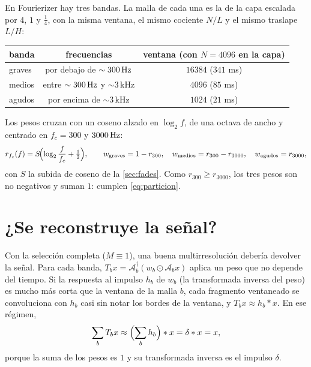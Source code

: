 En Fourierizer hay tres bandas. La malla de cada una es la de la capa escalada por $4$, $1$ y
$\tfrac14$, con la misma ventana, el mismo cociente $N/L$ y el mismo traslape $L/H$:
\begin{center}\small
\begin{tabular}{lcc}
\toprule
banda & frecuencias & ventana (con $N=4096$ en la capa) \\
\midrule
graves & por debajo de $\sim300\,\mathrm{Hz}$ & $16384$ ($341$ ms) \\
medios & entre $\sim300\,\mathrm{Hz}$ y $\sim3\,\mathrm{kHz}$ & $4096$ ($85$ ms) \\
agudos & por encima de $\sim3\,\mathrm{kHz}$ & $1024$ ($21$ ms) \\
\bottomrule
\end{tabular}
\end{center}
Los pesos cruzan con un coseno alzado en $\log_2 f$, de una octava de ancho y centrado en $f_c=300$ y
$3000\,\mathrm{Hz}$:
\[
  r_{f_c}(f)=S\!\Bigl(\log_2\frac{f}{f_c}+\tfrac12\Bigr),\qquad
  w_{\text{graves}}=1-r_{300},\quad w_{\text{medios}}=r_{300}-r_{3000},\quad w_{\text{agudos}}=r_{3000},
\]
con $S$ la subida de coseno de la \cref{sec:fades}. Como $r_{300}\ge r_{3000}$, los tres pesos son no
negativos y suman $1$: cumplen \eqref{eq:particion}.

\section{¿Se reconstruye la señal?}

Con la selección completa ($M\equiv1$), una buena multirresolución debería devolver la señal. Para
cada banda, $T_b x=\mathcal A_b^{\dagger}(w_b\odot\mathcal A_bx)$ aplica un peso que no depende del
tiempo. Si la respuesta al impulso $h_b$ de $w_b$ (la transformada inversa del peso) es mucho más
corta que la ventana de la malla $b$, cada fragmento ventaneado se convoluciona con $h_b$ casi sin
notar los bordes de la ventana, y $T_bx\approx h_b*x$. En ese régimen,
\[
  \sum_b T_b x\approx\Bigl(\sum_b h_b\Bigr)*x=\delta*x=x,
\]
porque la suma de los pesos es $1$ y su transformada inversa es el impulso $\delta$.

